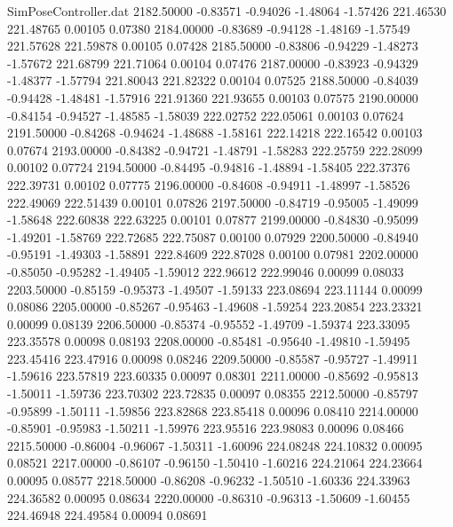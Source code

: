 \begin{filecontents}{SimPoseController.dat}
2182.50000   -0.83571   -0.94026    -1.48064   -1.57426  221.46530  221.48765    0.00105    0.07380
2184.00000   -0.83689   -0.94128    -1.48169   -1.57549  221.57628  221.59878    0.00105    0.07428
2185.50000   -0.83806   -0.94229    -1.48273   -1.57672  221.68799  221.71064    0.00104    0.07476
2187.00000   -0.83923   -0.94329    -1.48377   -1.57794  221.80043  221.82322    0.00104    0.07525
2188.50000   -0.84039   -0.94428    -1.48481   -1.57916  221.91360  221.93655    0.00103    0.07575
2190.00000   -0.84154   -0.94527    -1.48585   -1.58039  222.02752  222.05061    0.00103    0.07624
2191.50000   -0.84268   -0.94624    -1.48688   -1.58161  222.14218  222.16542    0.00103    0.07674
2193.00000   -0.84382   -0.94721    -1.48791   -1.58283  222.25759  222.28099    0.00102    0.07724
2194.50000   -0.84495   -0.94816    -1.48894   -1.58405  222.37376  222.39731    0.00102    0.07775
2196.00000   -0.84608   -0.94911    -1.48997   -1.58526  222.49069  222.51439    0.00101    0.07826
2197.50000   -0.84719   -0.95005    -1.49099   -1.58648  222.60838  222.63225    0.00101    0.07877
2199.00000   -0.84830   -0.95099    -1.49201   -1.58769  222.72685  222.75087    0.00100    0.07929
2200.50000   -0.84940   -0.95191    -1.49303   -1.58891  222.84609  222.87028    0.00100    0.07981
2202.00000   -0.85050   -0.95282    -1.49405   -1.59012  222.96612  222.99046    0.00099    0.08033
2203.50000   -0.85159   -0.95373    -1.49507   -1.59133  223.08694  223.11144    0.00099    0.08086
2205.00000   -0.85267   -0.95463    -1.49608   -1.59254  223.20854  223.23321    0.00099    0.08139
2206.50000   -0.85374   -0.95552    -1.49709   -1.59374  223.33095  223.35578    0.00098    0.08193
2208.00000   -0.85481   -0.95640    -1.49810   -1.59495  223.45416  223.47916    0.00098    0.08246
2209.50000   -0.85587   -0.95727    -1.49911   -1.59616  223.57819  223.60335    0.00097    0.08301
2211.00000   -0.85692   -0.95813    -1.50011   -1.59736  223.70302  223.72835    0.00097    0.08355
2212.50000   -0.85797   -0.95899    -1.50111   -1.59856  223.82868  223.85418    0.00096    0.08410
2214.00000   -0.85901   -0.95983    -1.50211   -1.59976  223.95516  223.98083    0.00096    0.08466
2215.50000   -0.86004   -0.96067    -1.50311   -1.60096  224.08248  224.10832    0.00095    0.08521
2217.00000   -0.86107   -0.96150    -1.50410   -1.60216  224.21064  224.23664    0.00095    0.08577
2218.50000   -0.86208   -0.96232    -1.50510   -1.60336  224.33963  224.36582    0.00095    0.08634
2220.00000   -0.86310   -0.96313    -1.50609   -1.60455  224.46948  224.49584    0.00094    0.08691

\end{filecontents}
